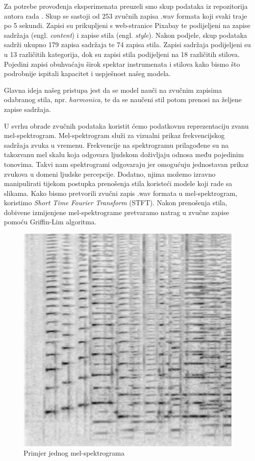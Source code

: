 Za potrebe provođenja eksperimenata preuzeli smo skup podataka iz repozitorija autora rada \cite{huang2024musicstyletransferdiffusion}. Skup se sastoji od 253 zvučnih zapisa .wav formata koji svaki traje po 5 sekundi. Zapisi su prikupljeni s web-stranice Pixabay te podijeljeni na zapise sadržaja (engl. \textit{content}) i zapise stila (engl. \textit{style}). Nakon podjele, skup podataka sadrži ukupno 179 zapisa sadržaja te 74 zapisa stila. Zapisi sadržaja podijeljeni su u 13 različitih kategorija, dok su zapisi stila podijeljeni na 18 različitih stilova. Pojedini zapisi obuhvaćaju širok spektar instrumenata i stilova kako bismo što podrobnije ispitali kapacitet i uspješnost našeg modela.

Glavna ideja našeg pristupa jest da se model nauči na zvučnim zapisima odabranog stila, npr. \textit{harmonica}, te da se naučeni stil potom prenosi na željene zapise sadržaja.

U svrhu obrade zvučnih podataka koristit ćemo podatkovnu reprezentaciju zvanu mel-spektrogram. Mel-spektrogram služi za vizualni prikaz frekvencijskog sadržaja zvuka u vremenu. Frekvencije na spektrogramu prilagođene su na takozvanu mel skalu koja odgovara ljudskom doživljaju odnosa među pojedinim tonovima. Takvi nam spektrogrami odgovaraju jer omogućuju jednostavan prikaz zvukova u domeni ljudske percepcije. Dodatno, njima možemo izravno manipulirati tijekom postupka prenošenja stila koristeći modele koji rade sa slikama. Kako bismo pretvorili zvučni zapis .wav formata u mel-spektrogram, koristimo \textit{Short Time Fourier Transform} (STFT). Nakon prenošenja stila, dobivene izmijenjene mel-spektrograme pretvaramo natrag u zvučne zapise pomoću Griffin-Lim algoritma.

\begin{figure}[H]
    \centering
    \includegraphics[width=0.5\linewidth]{imgs/spektrogram.png}
    \caption{Primjer jednog mel-spektrograma}
    \label{fig:spektrogram_primjer}
\end{figure}